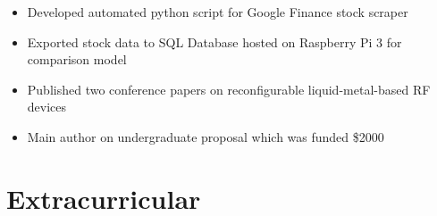 \documentclass{resume}
\begin{document}
\begin{itemize}[noitemsep, nolistsep]
  \item Developed automated python script for Google Finance stock scraper 
  \item Exported stock data to SQL Database hosted on Raspberry Pi 3 for comparison model
\end{itemize}

\begin{itemize}[noitemsep,nolistsep]
  \item Published two conference papers on reconfigurable liquid-metal-based RF devices
  \item Main author on undergraduate proposal which was funded \$2000
\end{itemize}




\section{%
Extracurricular}
\end{document}

